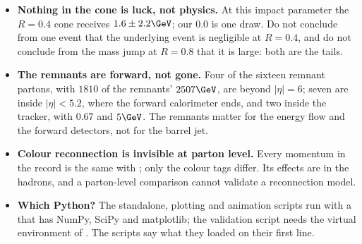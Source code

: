 \begin{pitfalls}
\begin{itemize}[nosep]
    has 155 partons from the secondary systems; the analyser's rule, which
    assigns emissions to ISR and FSR whatever system made them, counts 45.
    Say which rule you use before comparing with a \CMSSW figure.
  \item \textbf{Nothing in the cone is luck, not physics.} At this impact
    parameter the $R=0.4$ cone receives $1.6\pm2.2\GeV$; our $0.0$ is one
    draw. Do not conclude from one event that the underlying event is
    negligible at $R=0.4$, and do not conclude from the mass jump at
    $R=0.8$ that it is large: both are the tails.
  \item \textbf{The remnants are forward, not gone.} Four of the sixteen
    remnant partons, with $1810$ of the remnants' $2507\GeV$, are beyond
    $|\eta|=6$; seven are inside $|\eta|<5.2$, where the forward calorimeter
    ends, and two inside the tracker, with $0.67$ and $5\GeV$. The remnants
    matter for the energy flow and the forward detectors, not for the
    barrel jet.
  \item \textbf{Colour reconnection is invisible at parton level.} Every
    momentum in the record is the same with ; only the colour
    tags differ. Its effects are in the hadrons, and a parton-level
    comparison cannot validate a reconnection model.
  \item \textbf{Which Python?} The standalone, plotting and animation
    scripts run with a  that has NumPy, SciPy and matplotlib;
    the validation script needs the virtual environment of
    . The scripts say what they loaded on their
    first line.
\end{itemize}
\end{pitfalls}

